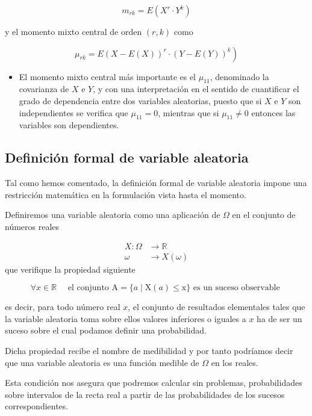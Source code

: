 \documentclass[
]{article}
\providecommand{\tightlist}{%
  \setlength{\itemsep}{0pt}\setlength{\parskip}{0pt}}
\begin{document}
\[
m_{r k}=E\left(X^{r} \cdot Y^{k}\right)
\]

y el momento mixto central de orden \((r, k)\) como

\[
\left.\mu_{r k}=E(X-E(X))^{r} \cdot(Y-E(Y))^{k}\right)
\]

\begin{itemize}
\tightlist
\item
  El momento mixto central más importante es el \(\mu_{11}\), denominado
  la covarianza de \(X\) e \(Y\), y con una interpretación en el sentido
  de cuantificar el grado de dependencia entre dos variables
  aleatorias, puesto que si \(X\) e \(Y\) son independientes se verifica
  que \(\mu_{11}=0\), mientras que si \(\mu_{11} \neq 0\) entonces las
  variables son dependientes.
\end{itemize}

\subsection{Definición formal de variable aleatoria}\label{definiciuxf3n-formal-de-variable-aleatoria}

Tal como hemos comentado, la definición formal de variable aleatoria
impone una restricción matemática en la formulación vista hasta el
momento.

Definiremos una variable aleatoria como una aplicación de \(\Omega\) en el
conjunto de números reales

\[
\begin{aligned}
X: \Omega & \rightarrow \mathbb{R} \\
\omega & \rightarrow X(\omega)
\end{aligned}
\] que verifique la propiedad siguiente

\[
\forall x \in \mathbb{R} \quad \text { el conjunto } \mathrm{A}=\{a \mid \mathrm{X}(a) \leq \mathrm{x}\} \text { es un suceso observable }
\]

es decir, para todo número real \(x\), el conjunto de resultados
elementales tales que la variable aleatoria toma sobre ellos valores
inferiores o iguales a \(x\) ha de ser un suceso sobre el cual podamos
definir una probabilidad.

Dicha propiedad recibe el nombre de medibilidad y por tanto podríamos
decir que una variable aleatoria es una función medible de \(\Omega\) en
los reales.

Esta condición nos asegura que podremos calcular sin problemas,
probabilidades sobre intervalos de la recta real a partir de las
probabilidades de los sucesos correspondientes.
\end{document}
